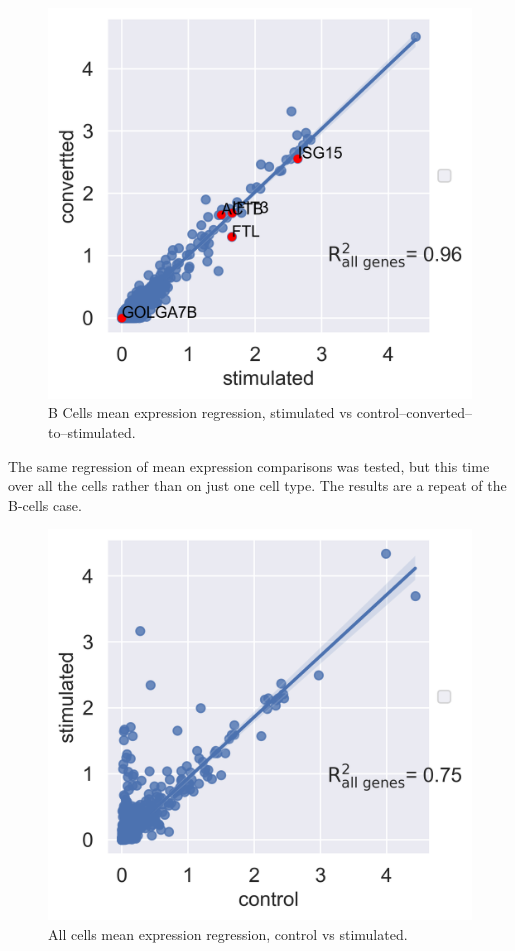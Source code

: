 \documentclass[11pt, a4paper]{report}
\theoremstyle{plain}
\theoremstyle{definition}
\theoremstyle{remark}
\begin{document}
\begin{figure}[h]
\centering
\includegraphics[width=1.1\textwidth]{images/Kang_bcells_stimulated_converted.png}
\caption{
B Cells mean expression regression, stimulated vs
control--converted--to--stimulated.
}
\label{fig:Kang_bcells_stimulated_converted}
\end{figure}

The same regression of mean expression comparisons was tested, but this time
over all the cells rather than on just one cell type. The results are a repeat
of the B-cells case.

\begin{figure}[h]
\centering
\includegraphics[width=1.1\textwidth]{images/Kang_allcells_ctrl_stim.png}
\caption{
All cells mean expression regression, control vs stimulated.
}
\label{fig:Kang_allcells_ctrl_stim}
\end{figure}
\end{document}
